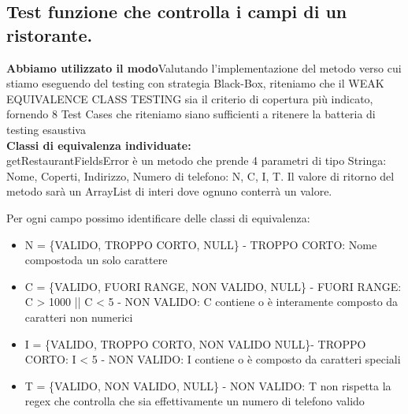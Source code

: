 \subsection{Test funzione che controlla i campi di un ristorante.}
\begin{flushleft}
    \textbf{Abbiamo utilizzato il modo}Valutando l'implementazione del metodo verso cui stiamo eseguendo del testing con strategia Black-Box, riteniamo che il WEAK EQUIVALENCE CLASS TESTING sia il criterio di copertura più indicato, fornendo
    8 Test Cases che riteniamo siano sufficienti a ritenere la batteria di testing esaustiva\\

    \textbf{Classi di equivalenza individuate:}\\ getRestaurantFieldsError è un metodo che prende 4 parametri di tipo Stringa: Nome, Coperti, Indirizzo, Numero di telefono: N, C, I, T.
    Il valore di ritorno del metodo sarà un ArrayList di interi dove ognuno conterrà un valore.

    Per ogni campo possimo identificare delle classi di equivalenza:
    \begin{itemize}
        \item N = \{VALIDO, TROPPO CORTO, NULL\} - TROPPO CORTO: Nome compostoda un solo carattere
        \item C = \{VALIDO, FUORI RANGE, NON VALIDO, NULL\} - FUORI RANGE: C > 1000 || C < 5 - NON VALIDO: C contiene o è interamente composto da caratteri non numerici
        \item I = \{VALIDO, TROPPO CORTO, NON VALIDO NULL\}- TROPPO CORTO: I < 5 - NON VALIDO: I contiene o è composto da caratteri speciali
        \item T = \{VALIDO, NON VALIDO, NULL\} - NON VALIDO: T non rispetta la regex che controlla che sia effettivamente un numero di telefono valido\\

    \end{itemize}
    

\end{flushleft}
\vspace{0.2cm}

